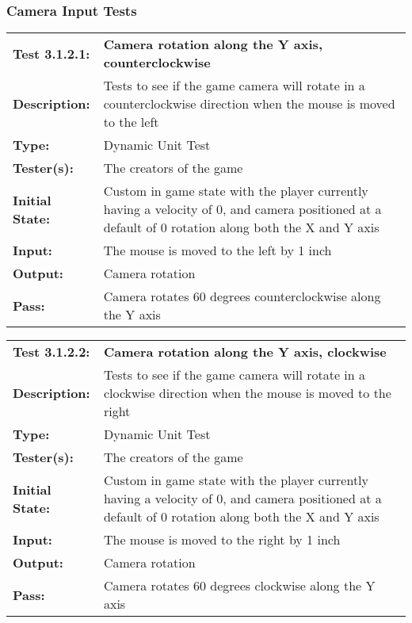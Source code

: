 \documentclass[12pt, titlepage]{article}
\begin{document}
\subsubsection{Camera Input Tests}
\begin{mdframed}[linewidth=1pt]
\begin{tabularx}{\textwidth}{@{}p{3cm}X@{}}
{\bf Test 3.1.2.1:} & {\bf Camera rotation along the Y axis, counterclockwise}\\[\baselineskip]
{\bf Description:} & Tests to see if the game camera will rotate in a counterclockwise direction when the mouse is moved to the left\\[0.5\baselineskip]
{\bf Type:} & Dynamic Unit Test\\[0.5\baselineskip]
{\bf Tester(s):} & The creators of the game\\[0.5\baselineskip]
{\bf Initial State:} & Custom in game state with the player currently having a velocity of 0, and camera positioned at a default of 0 rotation along both the X and Y axis\\[0.5\baselineskip]
{\bf Input:} & The mouse is moved to the left by 1 inch\\[0.5\baselineskip]
{\bf Output:} & Camera rotation\\[0.5\baselineskip]
{\bf Pass:} & Camera rotates 60 degrees counterclockwise along the Y axis
\end{tabularx}
\end{mdframed}

\begin{mdframed}[linewidth=1pt]
\begin{tabularx}{\textwidth}{@{}p{3cm}X@{}}
{\bf Test 3.1.2.2:} & {\bf Camera rotation along the Y axis, clockwise}\\[\baselineskip]
{\bf Description:} & Tests to see if the game camera will rotate in a clockwise direction when the mouse is moved to the right\\[0.5\baselineskip]
{\bf Type:} & Dynamic Unit Test\\[0.5\baselineskip]
{\bf Tester(s):} & The creators of the game\\[0.5\baselineskip]
{\bf Initial State:} & Custom in game state with the player currently having a velocity of 0, and camera positioned at a default of 0 rotation along both the X and Y axis\\[0.5\baselineskip]
{\bf Input:} & The mouse is moved to the right by 1 inch\\[0.5\baselineskip]
{\bf Output:} & Camera rotation\\[0.5\baselineskip]
{\bf Pass:} & Camera rotates 60 degrees clockwise along the Y axis
\end{tabularx}
\end{mdframed}
\end{document}
